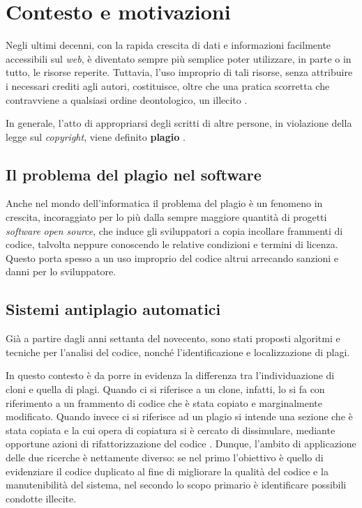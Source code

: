 \chapter{Contesto e motivazioni}
\label{chapter:context-and-motivations}

Negli ultimi decenni, con la rapida crescita di dati e informazioni facilmente accessibili sul \textit{web}, è diventato sempre più semplice poter utilizzare, in parte o in tutto, le risorse reperite.
%
Tuttavia, l'uso improprio di tali risorse, senza attribuire i necessari crediti agli autori, costituisce, oltre che una pratica scorretta che contravviene a qualsiasi ordine deontologico, un illecito \cite{copyright-law-italia}.

In generale, l'atto di appropriarsi degli scritti di altre persone, in violazione della legge sul \textit{copyright}, viene definito \textbf{plagio} \cite{britannica}.

\section{Il problema del plagio nel software}
Anche nel mondo dell'informatica il problema del plagio è un fenomeno in crescita, incoraggiato per lo più dalla sempre maggiore quantità di progetti \textit{software} \textit{open source}, che induce gli sviluppatori a copia incollare frammenti di codice, talvolta neppure conoscendo le relative condizioni e termini di licenza.
%
Questo porta spesso a un uso improprio del codice altrui arrecando sanzioni e danni per lo sviluppatore.


\section{Sistemi antiplagio automatici}


Già a partire dagli anni settanta del novecento, sono stati proposti algoritmi e tecniche per l'analisi del codice, nonché l'identificazione e localizzazione di plagi.

In questo contesto è da porre in evidenza la differenza tra l'individuazione di cloni e quella di plagi.
%
Quando ci si riferisce a un clone, infatti, lo si fa con riferimento a un frammento di codice che è stata copiato e marginalmente modificato. 
%
Quando invece ci si riferisce ad un plagio si intende una sezione che è stata copiata e la cui opera di copiatura si è cercato di dissimulare, mediante opportune azioni di rifattorizzazione del codice \cite{muddu-et-al-2013}.  
%
Dunque, l'ambito di applicazione delle due ricerche è nettamente diverso: se nel primo l'obiettivo è quello di evidenziare il codice duplicato al fine di migliorare la qualità del codice e la manutenibilità del sistema, nel secondo lo scopo primario è identificare possibili condotte illecite.

